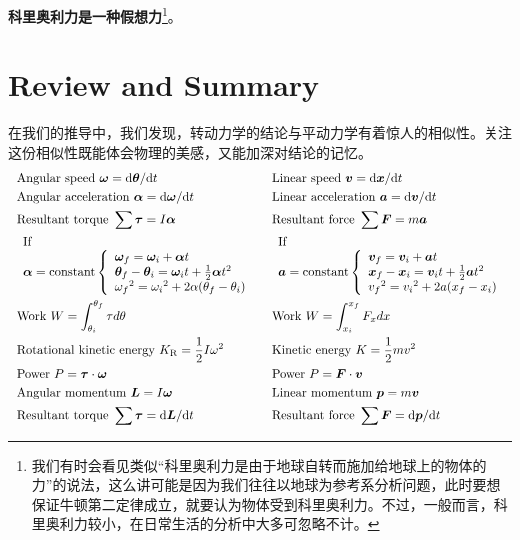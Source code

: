 {\bfseries 科里奥利力是一种假想力}\footnote{我们有时会看见类似“科里奥利力是由于地球自转而施加给地球上的物体的力”的说法，这么讲可能是因为我们往往以地球为参考系分析问题，此时要想保证牛顿第二定律成立，就要认为物体受到科里奥利力。不过，一般而言，科里奥利力较小，在日常生活的分析中大多可忽略不计。}。
\section[回顾与总结]{Review and Summary}
在我们的推导中，我们发现，转动力学的结论与平动力学有着惊人的相似性。关注这份相似性既能体会物理的美感，又能加深对结论的记忆。
\[\ \ \begin{aligned}
	&\mathrm{Angular~speed~}\boldsymbol{\omega}=\mathrm{d}\boldsymbol{\theta}/\mathrm{d} t&& \mathrm{Linear~speed~}\boldsymbol{v}=\mathrm{d} \boldsymbol{x}/\mathrm{d} t  \\
	&\mathrm{Angular~acceleration~}\boldsymbol{\alpha}=\mathrm{d}\boldsymbol{\omega}/\mathrm{d} t&& \mathrm{Linear~acceleration~}\boldsymbol{a}=\mathrm{d} \boldsymbol{v}/\mathrm{d} t  \\
	&\mathrm{Resultant~torque~}\sum\boldsymbol{\tau}=I\boldsymbol{\alpha} && \mathrm{Resultant~force~}\sum \boldsymbol{F}=m\boldsymbol{a}  \\
	&\begin{array}{l}{{\mathrm{If}}}\\{\boldsymbol{\alpha}=\mathrm{constant}}\left\{\begin{array}{l}{{\boldsymbol{\omega}_{f}=\boldsymbol{\omega}_{i}+\boldsymbol{\alpha} t}}\\{{\boldsymbol{\theta}_{f}-\boldsymbol{\theta}_{i}=\boldsymbol{\omega}_{i}t+\frac{1}{2}\boldsymbol{\alpha} t^{2}}}\\{{\omega_{f}{}^{2}=\omega_{i}{}^{2}+2\alpha(\theta_{f}-\theta_{i})}}\end{array}\right.\end{array}
	&&
	\begin{array}{l}{{\mathrm{If}}}\\{\boldsymbol{a}=\mathrm{constant}}\left\{\begin{array}{l}{{\boldsymbol{v}_{f}=\boldsymbol{v}_{i}+\boldsymbol{a}t}}\\{{\boldsymbol{x}_{f}-\boldsymbol{x}_{i}=\boldsymbol{v}_{i}t+\frac{1}{2}\boldsymbol{a}t^{2}}}\\{{v_{f}{}^{2}=v_{i}{}^{2}+2a(x_{f}-x_{i})}}\end{array}\right.\end{array}  \\
	&\mathrm{Work}\ W=\int_{\theta_{i}}^{\theta_{f}}\tau d\theta && \mathrm{Work}\ W=\int_{x_{i}}^{x_{f}}F_{x}dx  \\
	&\mathrm{Rotational~kinetic~energy~}K_{\mathrm{R}}=\frac{1}{2}I\omega^{2}&& \mathrm{Kinetic~energy~}K=\frac{1}{2}mv^{2}  \\
	&\mathrm{Power}\ P=\boldsymbol{\tau}\cdot\boldsymbol{\omega}&& \mathrm{Power}\ P=\boldsymbol{F}\cdot\boldsymbol{v}  \\
	&\mathrm{Angular~momentum~}\boldsymbol{L}=I\boldsymbol{\omega} && \mathrm{Linear~momentum~}\boldsymbol{p}=m\boldsymbol{v}  \\
	&\mathrm{Resultant~torque~}\sum\boldsymbol{\tau}=\mathrm{d} \boldsymbol{L}/\mathrm{d} t&& \mathrm{Resultant~force~}\sum \boldsymbol{F}=\mathrm{d} \boldsymbol{p}/\mathrm{d} t 
\end{aligned}\]




  






